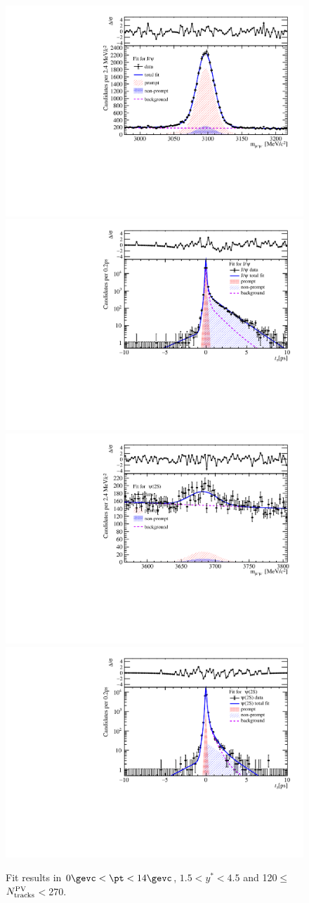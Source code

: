 \begin{figure}[H]
\begin{center}
\includegraphics[width=0.45\linewidth]{pdf/Pbp/Workdir/TwoDimFit/ProjMass/Jpsi_n5y1pt1.pdf}
\includegraphics[width=0.45\linewidth]{pdf/Pbp/Workdir/TwoDimFit/ProjTz/Jpsi_n5y1pt1.pdf}
\vspace*{-0.5cm}
\includegraphics[width=0.45\linewidth]{pdf/Pbp/Workdir/TwoDimFit/ProjMass/Psi2S_n5y1pt1.pdf}
\includegraphics[width=0.45\linewidth]{pdf/Pbp/Workdir/TwoDimFit/ProjTz/Psi2S_n5y1pt1.pdf}
\vspace*{-0.5cm}
\end{center}
\caption{Fit results in $0\gevc<\pt<14\gevc$, $1.5<y^*<4.5$ and 120$\leq$$N_{\rm tracks}^{\rm PV}$$<$270.}
\end{figure}

